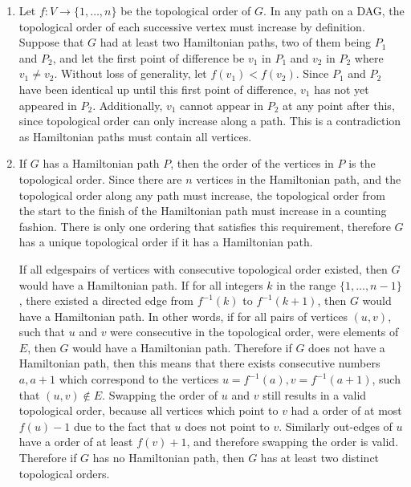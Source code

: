 \documentclass{article}
\begin{document}
\begin{solution}
\begin{enumerate}[label = (\alph*)]
    \item 
    Let $f:V\to \{1, \dots, n\}$ be the topological order of $G$. 
    In any path on a DAG, the topological order of each successive vertex must increase by definition.
    Suppose that $G$ had at least two Hamiltonian paths, two of them being $P_1$ and $P_2$, and let the first point of difference be $v_1$ in $P_1$ and $v_2$ in $P_2$ where $v_1\neq v_2$.
    Without loss of generality, let $f(v_1) < f(v_2)$. Since $P_1$ and $P_2$ have been identical up until this first point of difference, 
    $v_1$ has not yet appeared in $P_2$. Additionally, $v_1$ cannot appear in $P_2$ at any point after this, since topological order can only increase along a path. 
    This is a contradiction as Hamiltonian paths must contain all vertices.
    \item 
    If $G$ has a Hamiltonian path $P$, then the order of the vertices in $P$ is the topological order. 
    Since there are $n$ vertices in the Hamiltonian path, and the topological order along any path must increase, 
    the topological order from the start to the finish of the Hamiltonian path must increase in a counting fashion.
    There is only one ordering that satisfies this requirement, therefore $G$ has a unique topological order if it has a Hamiltonian path.

    If all edgespairs of vertices with consecutive topological order existed, then $G$ would have a Hamiltonian path.
    If for all integers $k$ in the range $\{1,\dots, n-1\}$, there existed a directed edge from $f^{-1}(k)$ to $f^{-1}(k + 1)$, then $G$ would have a Hamiltonian path.
    In other words, if for all pairs of vertices $(u,v)$, such that $u$ and $v$ were consecutive in the topological order, were elements of $E$, then $G$ would have a Hamiltonian path.
    Therefore if $G$ does not have a Hamiltonian path, then this means that there exists consecutive numbers $a, a + 1$ which correspond to the vertices
     $u=f^{-1}(a), v=f^{-1}(a+1)$, such that $(u, v)\notin E$.
    Swapping the order of $u$ and $v$ still results in a valid topological order, because all vertices which point to $v$ had a order of at most $f(u) - 1$ due to the fact
    that $u$ does not point to $v$. Similarly out-edges of $u$ have a order of at least $f(v) + 1$, and therefore swapping the order is valid.
    Therefore if $G$ has no Hamiltonian path, then $G$ has at least two distinct topological orders.


\end{enumerate}
\end{solution}
\end{document}
